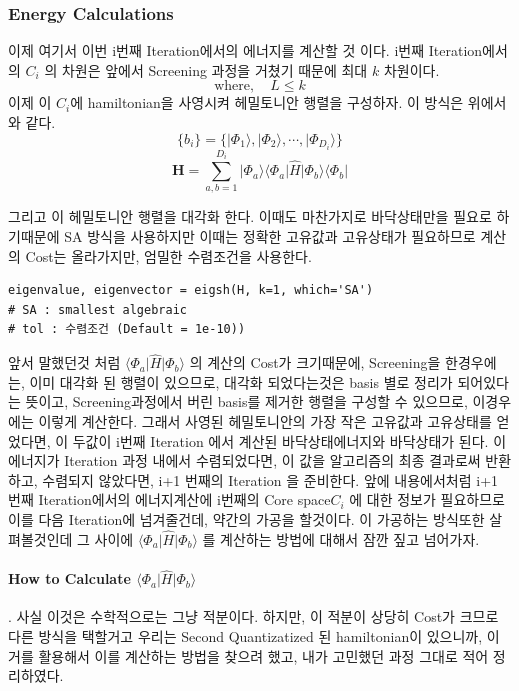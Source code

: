 \documentclass[11pt]{article}
\begin{document}
\subsubsection{Energy Calculations}
이제 여기서 이번 i번째 Iteration에서의 에너지를 계산할 것 이다.
i번째 Iteration에서의 \(C_i\) 의 차원은 앞에서 Screening 과정을 거쳤기 때문에 최대 \(k\) 차원이다. 
\[
\text{where}, \quad L \leq k
\]
이제 이 \(C_i\)에 hamiltonian을 사영시켜 헤밀토니안 행렬을 구성하자. 이 방식은 위에서와 같다. 
\[
\{b_i\} = \{\vert \Phi_1 \rangle, \vert \Phi_2 \rangle, \cdots, \vert \Phi_{D_i} \rangle \}
\]
\[
\mathbf{H} = \sum_{a,b=1}^{D_i} \vert \Phi_a \rangle \langle \Phi_a \vert \hat{H} \vert \Phi_b \rangle \langle \Phi_b \vert
\]

그리고 이 헤밀토니안 행렬을 대각화 한다. 이때도 마찬가지로 바닥상태만을 필요로 하기때문에 SA 방식을 사용하지만 이때는 정확한 고유값과 고유상태가 필요하므로 계산의 Cost는 올라가지만, 엄밀한 수렴조건을 사용한다. 
\begin{lstlisting}[style=pythonstyle]
eigenvalue, eigenvector = eigsh(H, k=1, which='SA')  
# SA : smallest algebraic
# tol : 수렴조건 (Default = 1e-10))
\end{lstlisting}
앞서 말했던것 처럼 \(\langle \Phi_a \vert \hat{H} \vert \Phi_b \rangle\) 의 계산의 Cost가 크기때문에, Screening을 한경우에는, 이미 대각화 된 행렬이 있으므로, 
대각화 되었다는것은 basis 별로 정리가 되어있다는 뜻이고, Screening과정에서 버린 basis를 제거한 행렬을 구성할 수 있으므로, 이경우에는 이렇게 계산한다. 
그래서 사영된 헤밀토니안의 가장 작은 고유값과 고유상태를 얻었다면, 이 두값이 i번째 Iteration 에서 계산된 바닥상태에너지와 바닥상태가 된다. 
이 에너지가 Iteration 과정 내에서 수렴되었다면, 이 값을 알고리즘의 최종 결과로써 반환하고, 수렴되지 않았다면, i+1 번째의 Iteration 을 준비한다. 
앞에 내용에서처럼 i+1 번째 Iteration에서의 에너지계산에 i번째의 Core space\(C_i\) 에 대한 정보가 필요하므로 이를 다음 Iteration에 넘겨줄건데, 약간의 가공을 할것이다. 
이 가공하는 방식또한 살펴볼것인데 그 사이에 \(\langle \Phi_a \vert \hat{H} \vert \Phi_b \rangle\) 를 계산하는 방법에 대해서 잠깐 짚고 넘어가자. 

\paragraph{How to Calculate \(\langle \Phi_a \vert \hat{H} \vert \Phi_b \rangle\)}. \leavevmode \newline
사실 이것은 수학적으로는 그냥 적분이다. 하지만, 이 적분이 상당히 Cost가 크므로 다른 방식을 택할거고 우리는 Second Quantizatized 된 hamiltonian이 있으니까, 
이거를 활용해서 이를 계산하는 방법을 찾으려 했고, 내가 고민했던 과정 그대로 적어 정리하였다. 
\end{document}
